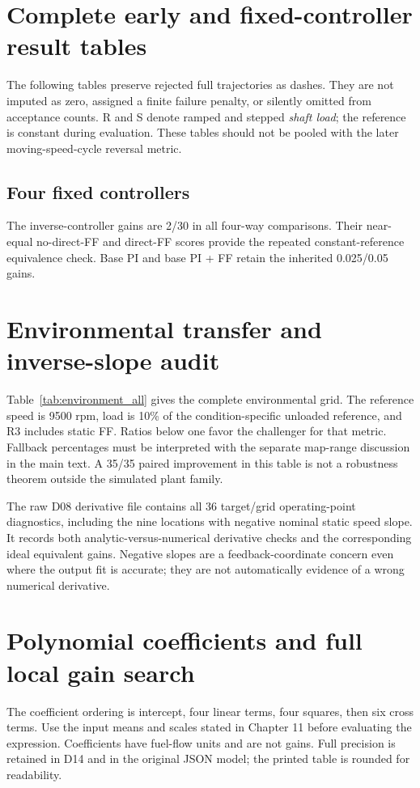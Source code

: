 \documentclass[11pt,a4paper,oneside]{report}
\begin{document}
\appendix
\chapter{Complete early and fixed-controller result tables}
\label{app:early}
The following tables preserve rejected full trajectories as dashes. They are not imputed as zero, assigned a finite failure penalty, or silently omitted from acceptance counts. R and S denote ramped and stepped \emph{shaft load}; the reference is constant during evaluation. These tables should not be pooled with the later moving-speed-cycle reversal metric.


\clearpage
\section{Four fixed controllers}
\label{app:fixed}
The inverse-controller gains are 2/30 in all four-way comparisons. Their near-equal no-direct-FF and direct-FF scores provide the repeated constant-reference equivalence check. Base PI and base PI + FF retain the inherited 0.025/0.05 gains.



\clearpage

\chapter{Environmental transfer and inverse-slope audit}
\label{app:grid}
Table~\ref{tab:environment_all} gives the complete environmental grid. The reference speed is 9500 rpm, load is 10\% of the condition-specific unloaded reference, and R3 includes static FF. Ratios below one favor the challenger for that metric. Fallback percentages must be interpreted with the separate map-range discussion in the main text. A 35/35 paired improvement in this table is not a robustness theorem outside the simulated plant family.

The raw D08 derivative file contains all 36 target/grid operating-point diagnostics, including the nine locations with negative nominal static speed slope. It records both analytic-versus-numerical derivative checks and the corresponding ideal equivalent gains. Negative slopes are a feedback-coordinate concern even where the output fit is accurate; they are not automatically evidence of a wrong numerical derivative.

\chapter{Polynomial coefficients and full local gain search}
\label{app:poly}
The coefficient ordering is intercept, four linear terms, four squares, then six cross terms. Use the input means and scales stated in Chapter 11 before evaluating the expression. Coefficients have fuel-flow units and are not gains. Full precision is retained in D14 and in the original JSON model; the printed table is rounded for readability.

\clearpage
\end{document}
